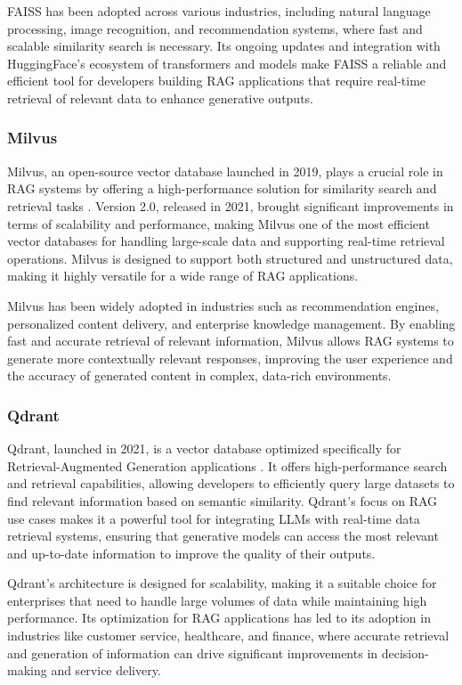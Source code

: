 FAISS has been adopted across various industries, including natural language processing, image recognition, and recommendation systems, where fast and scalable similarity search is necessary. 
Its ongoing updates and integration with HuggingFace's ecosystem of transformers and models make FAISS a reliable and efficient tool for developers building RAG applications that require real-time retrieval of relevant data to enhance generative outputs.

\subsubsection{Milvus}

Milvus, an open-source vector database launched in 2019, plays a crucial role in RAG systems by offering a high-performance solution for similarity search and retrieval tasks \cite{Milvus}. 
Version 2.0, released in 2021, brought significant improvements in terms of scalability and performance, making Milvus one of the most efficient vector databases for handling large-scale data and supporting real-time retrieval operations. 
Milvus is designed to support both structured and unstructured data, making it highly versatile for a wide range of RAG applications.

Milvus has been widely adopted in industries such as recommendation engines, personalized content delivery, and enterprise knowledge management. 
By enabling fast and accurate retrieval of relevant information, Milvus allows RAG systems to generate more contextually relevant responses, improving the user experience and the accuracy of generated content in complex, data-rich environments.

\subsubsection{Qdrant}

Qdrant, launched in 2021, is a vector database optimized specifically for Retrieval-Augmented Generation applications \cite{Qdrant}. 
It offers high-performance search and retrieval capabilities, allowing developers to efficiently query large datasets to find relevant information based on semantic similarity. 
Qdrant's focus on RAG use cases makes it a powerful tool for integrating LLMs with real-time data retrieval systems, ensuring that generative models can access the most relevant and up-to-date information to improve the quality of their outputs.

Qdrant's architecture is designed for scalability, making it a suitable choice for enterprises that need to handle large volumes of data while maintaining high performance. 
Its optimization for RAG applications has led to its adoption in industries like customer service, healthcare, and finance, where accurate retrieval and generation of information can drive significant improvements in decision-making and service delivery.


